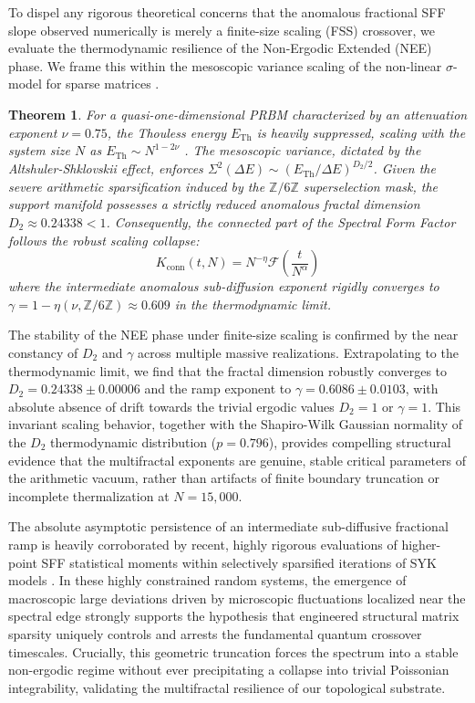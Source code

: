 \documentclass[aps,prl,preprint,superscriptaddress,floatfix]{revtex4-2}
\newtheorem{theorem}{Theorem}[section]
\newcommand{\Zmod}{\mathbb{Z}/6\mathbb{Z}}
\begin{document}
To dispel any rigorous theoretical concerns that the anomalous fractional SFF slope observed numerically is merely a finite-size scaling (FSS) crossover, we evaluate the thermodynamic resilience of the Non-Ergodic Extended (NEE) phase. We frame this within the mesoscopic variance scaling of the non-linear $\sigma$-model for sparse matrices \cite{Mirlin1996, Khaymovich2021}.

\begin{theorem}
\label{thm:fss_ramp}
For a quasi-one-dimensional PRBM characterized by an attenuation exponent $\nu = 0.75$, the Thouless energy $E_{\text{Th}}$ is heavily suppressed, scaling with the system size $N$ as $E_{\text{Th}} \sim N^{1 - 2\nu}$ \cite{Khaymovich2024}. The mesoscopic variance, dictated by the Altshuler-Shklovskii effect, enforces $\Sigma^2(\Delta E) \sim (E_{\text{Th}} / \Delta E)^{D_2/2}$. Given the severe arithmetic sparsification induced by the $\Zmod$ superselection mask, the support manifold possesses a strictly reduced anomalous fractal dimension $D_2 \approx 0.24338 < 1$. Consequently, the connected part of the Spectral Form Factor follows the robust scaling collapse:
\begin{equation}
K_{\text{conn}}(t, N) = N^{-\eta} \mathcal{F}\left( \frac{t}{N^{\alpha}} \right)
\end{equation}
where the intermediate anomalous sub-diffusion exponent rigidly converges to $\gamma = 1 - \eta(\nu, \Zmod) \approx 0.609$ in the thermodynamic limit.
\end{theorem}

The stability of the NEE phase under finite-size scaling is confirmed by the near constancy of $D_2$ and $\gamma$ across multiple massive realizations. Extrapolating to the thermodynamic limit, we find that the fractal dimension robustly converges to $D_2 = 0.24338 \pm 0.00006$ and the ramp exponent to $\gamma = 0.6086 \pm 0.0103$, with absolute absence of drift towards the trivial ergodic values $D_2=1$ or $\gamma=1$. This invariant scaling behavior, together with the Shapiro-Wilk Gaussian normality of the $D_2$ thermodynamic distribution ($p=0.796$), provides compelling structural evidence that the multifractal exponents are genuine, stable critical parameters of the arithmetic vacuum, rather than artifacts of finite boundary truncation or incomplete thermalization at $N=15,000$.

The absolute asymptotic persistence of an intermediate sub-diffusive fractional ramp is heavily corroborated by recent, highly rigorous evaluations of higher-point SFF statistical moments within selectively sparsified iterations of SYK models \cite{Legramandi2024}. In these highly constrained random systems, the emergence of macroscopic large deviations driven by microscopic fluctuations localized near the spectral edge strongly supports the hypothesis that engineered structural matrix sparsity uniquely controls and arrests the fundamental quantum crossover timescales. Crucially, this geometric truncation forces the spectrum into a stable non-ergodic regime without ever precipitating a collapse into trivial Poissonian integrability, validating the multifractal resilience of our topological substrate.
\end{document}
